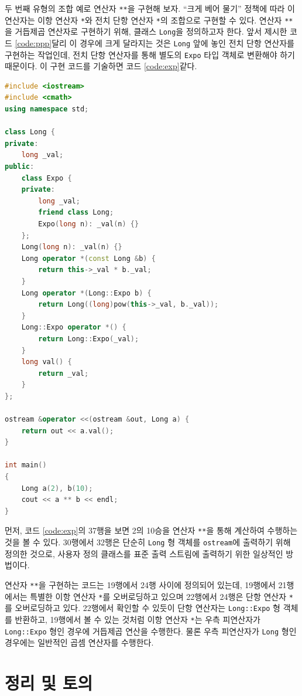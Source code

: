 \documentclass[titlepage]{pnureport}
\begin{document}
두 번째 유형의 조합 예로 연산자 \texttt{**}을 구현해 보자. ``크게 베어 물기'' 정책에 따라 이 연산자는 이항 연산자 \verb|*|와 전치 단항 연산자 \verb|*|의 조합으로 구현할 수 있다. 연산자 \verb|**|을 거듭제곱 연산자로 구현하기 위해, 클래스 \texttt{Long}을 정의하고자 한다. 앞서 제시한 코드 \ref{code:ppp}\과 달리 이 경우에 크게 달라지는 것은 \texttt{Long} 앞에 놓인 전치 단항 연산자를 구현하는 작업인데, 전치 단항 연산자를 통해 별도의 \texttt{Expo} 타입 객체로 변환해야 하기 때문이다. 이 구현 코드를 기술하면 코드 \ref{code:exp}\와 같다.

\begin{lstlisting}[language=c++,caption={연산자 \texttt{**}의 구현 코드},label=code:exp]
#include <iostream>
#include <cmath>
using namespace std;

class Long {
private:
    long _val;
public:
    class Expo {
    private:
        long _val;
        friend class Long;
        Expo(long n): _val(n) {}
    };
    Long(long n): _val(n) {}
    Long operator *(const Long &b) {
        return this->_val * b._val;
    }
    Long operator *(Long::Expo b) {
        return Long((long)pow(this->_val, b._val));
    }
    Long::Expo operator *() {
        return Long::Expo(_val);
    }
    long val() {
        return _val;
    }
};

ostream &operator <<(ostream &out, Long a) {
    return out << a.val();
}

int main()
{
    Long a(2), b(10);
    cout << a ** b << endl;
}
\end{lstlisting}
먼저, 코드 \ref{code:exp}의 37행을 보면 2의 10승을 연산자 \texttt{**}을 통해 계산하여 수행하는 것을 볼 수 있다. 30행에서 32행은 단순히 \texttt{Long} 형 객체를 \texttt{ostream}에 출력하기 위해 정의한 것으로, 사용자 정의 클래스를 표준 출력 스트림에 출력하기 위한 일상적인 방법이다. 

연산자 \texttt{**}을 구현하는 코드는 19행에서 24행 사이에 정의되어 있는데, 19행에서 21행에서는 특별한 이항 연산자 \texttt{*}를 오버로딩하고 있으며 22행에서 24행은 단항 연산자 \texttt{*}를 오버로딩하고 있다. 22행에서 확인할 수 있듯이 단항 연산자는 \texttt{Long::Expo} 형 객체를 반환하고, 19행에서 볼 수 있는 것처럼 이항 연산자 \texttt{*}는 우측 피연산자가 \texttt{Long::Expo} 형인 경우에 거듭제곱 연산을 수행한다. 물론 우측 피연산자가 \texttt{Long} 형인 경우에는 일반적인 곱셈 연산자를 수행한다.

\chapter{정리 및 토의}
\label{ch:discussion}
\end{document}
